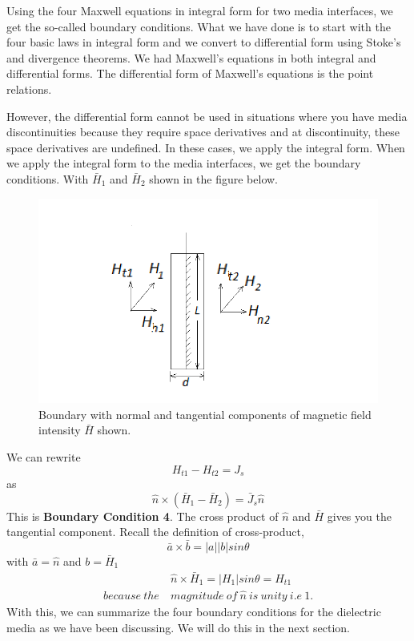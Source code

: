 Using the four Maxwell equations in integral form for two media interfaces, we get the so-called boundary conditions. What we have done is to start with the four basic laws in integral form and we convert to differential form using Stoke's and divergence theorems. We had Maxwell's equations in both integral and differential forms. The differential form of Maxwell's equations is the point relations.

However, the differential form cannot be used in situations where you have media discontinuities because they require space derivatives and at discontinuity, these space derivatives are undefined. In these cases, we apply the integral form. When we apply the integral form to the media interfaces, we get the boundary conditions. With $\bar{H}_1$ and $\bar{H}_2$ shown in the figure below.
\begin{figure}[h]
\centering
\includegraphics[width=1\linewidth]{graphics/diemedium4_2_2}
\caption{Boundary with normal and tangential components of magnetic field intensity $\bar{H}$ shown.}
\end{figure}

We can rewrite 
\begin{equation*}
H_{t1} - H_{t2} = J_s
\end{equation*}
as
\begin{equation}
\hat{n} \times (\bar{H}_1 - \bar{H}_2) = \bar{J}_s\hat{n}
\end{equation}
This is \textbf{Boundary Condition 4}. The cross product of $\hat{n}$ and $\bar{H}$ gives you the tangential component. Recall the definition of cross-product,
\begin{equation*}
\bar{a}\times\bar{b} = \left|a \right| \left|b \right|sin\theta 
\end{equation*}
with $\bar{a} = \hat{n}$ and $ b = \bar{H}_1$
\begin{align*}
&\hat{n}\times\bar{H}_1 = \left|H_1 \right|sin\theta = H_{t1} \\ because\ the\ & magnitude\ of\ \hat{n}\ is\ unity\ i.e\ 1.
\end{align*}
With this, we can summarize the four boundary conditions for the dielectric media as we have been discussing. We will do this in the next section.
